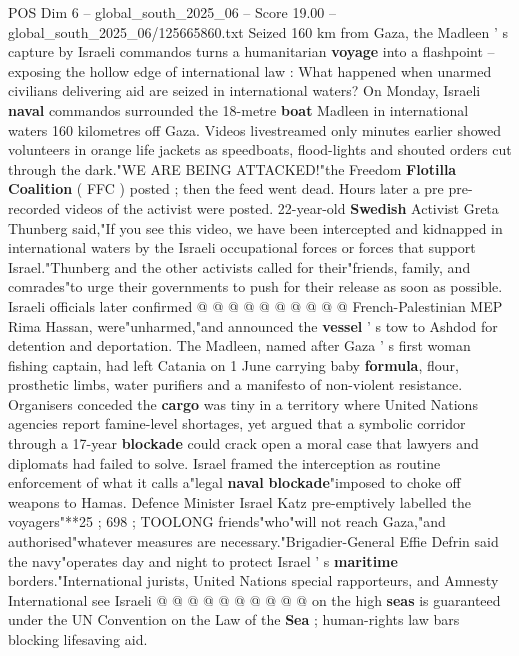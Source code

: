 \begin{textsample}{POS Dim 6 – global\_south\_2025\_06 – Score 19.00 – global\_south\_2025\_06/125665860.txt}  \label{ex:f6_pos_001}
Seized 160 km from Gaza, the Madleen ' s capture by Israeli commandos turns a humanitarian \textbf{voyage} into a flashpoint -- exposing the hollow edge of international law : What happened when unarmed civilians delivering aid are seized in international waters?
On Monday, Israeli \textbf{naval} commandos surrounded the 18-metre \textbf{boat} Madleen in international waters 160 kilometres off Gaza.
Videos livestreamed only minutes earlier showed volunteers in orange life jackets as speedboats, flood-lights and shouted orders cut through the dark."WE ARE BEING ATTACKED!"the Freedom \textbf{Flotilla} \textbf{Coalition} ( FFC ) posted ; then the feed went dead.
Hours later a pre pre-recorded videos of the activist were posted. 22-year-old \textbf{Swedish} Activist Greta Thunberg said,"If you see this video, we have been intercepted and kidnapped in international waters by the Israeli occupational forces or forces that support Israel."Thunberg and the other activists called for their"friends, family, and comrades"to urge their governments to push for their release as soon as possible.
Israeli officials later confirmed @ @ @ @ @ @ @ @ @ @ French-Palestinian MEP Rima Hassan, were"unharmed,"and announced the \textbf{vessel} ' s tow to Ashdod for detention and deportation.
The Madleen, named after Gaza ' s first woman fishing captain, had left Catania on 1 June carrying baby \textbf{formula}, flour, prosthetic limbs, water purifiers and a manifesto of non-violent resistance.
Organisers conceded the \textbf{cargo} was tiny in a territory where United Nations agencies report famine-level shortages, yet argued that a symbolic corridor through a 17-year \textbf{blockade} could crack open a moral case that lawyers and diplomats had failed to solve.
Israel framed the interception as routine enforcement of what it calls a"legal \textbf{naval} \textbf{blockade}"imposed to choke off weapons to Hamas.
Defence Minister Israel Katz pre-emptively labelled the voyagers"**25 ; 698 ; TOOLONG friends"who"will not reach Gaza,"and authorised"whatever measures are necessary."Brigadier-General Effie Defrin said the navy"operates day and night to protect Israel ' s \textbf{maritime} borders."International jurists, United Nations special rapporteurs, and Amnesty International see Israeli @ @ @ @ @ @ @ @ @ @ on the high \textbf{seas} is guaranteed under the UN Convention on the Law of the \textbf{Sea} ; human-rights law bars blocking lifesaving aid.

\end{textsample}
